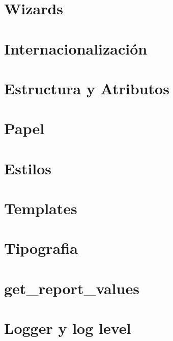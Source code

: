 \documentclass[letterpaper,10pt,spanish]{sphinxmanual}
\begin{document}
\section{Wizards}
\label{\detokenize{tecnico/wizards:wizards}}\label{\detokenize{tecnico/wizards:id1}}\label{\detokenize{tecnico/wizards::doc}}


\section{Internacionalización}
\label{\detokenize{tecnico/internacionalizacion:internacionalizacion}}\label{\detokenize{tecnico/internacionalizacion:id1}}\label{\detokenize{tecnico/internacionalizacion::doc}}


\section{Estructura y Atributos}
\label{\detokenize{tecnico/informes:estructura-y-atributos}}\label{\detokenize{tecnico/informes:informes}}\label{\detokenize{tecnico/informes::doc}}

\section{Papel}
\label{\detokenize{tecnico/informes:papel}}

\section{Estilos}
\label{\detokenize{tecnico/informes:estilos}}

\section{Templates}
\label{\detokenize{tecnico/informes:templates}}

\section{Tipografia}
\label{\detokenize{tecnico/informes:tipografia}}

\section{get\_report\_values}
\label{\detokenize{tecnico/informes:get-report-values}}


\section{Logger y log level}
\label{\detokenize{tecnico/debug/logger-y-log-level:logger-y-log-level}}\label{\detokenize{tecnico/debug/logger-y-log-level:id1}}\label{\detokenize{tecnico/debug/logger-y-log-level::doc}}
\end{document}
